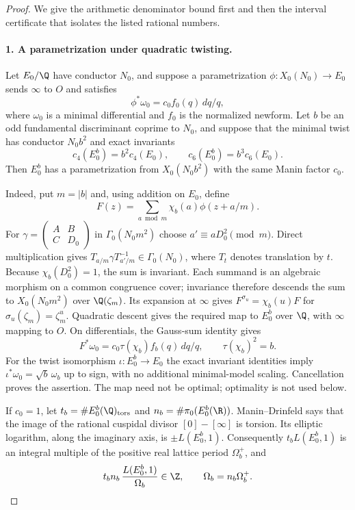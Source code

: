 \begin{proof}
We give the arithmetic denominator bound first and then the interval
certificate that isolates the listed rational numbers.

\paragraph{1. A parametrization under quadratic twisting.}
Let $E_0/\Q$ have conductor $N_0$, and suppose a parametrization
$\phi:X_0(N_0)\to E_0$ sends $\infty$ to $O$ and satisfies
\[
 \phi^*\omega_0=c_0f_0(q)\,dq/q,
\]
where $\omega_0$ is a minimal differential and $f_0$ is the normalized
newform. Let $b$ be an odd fundamental discriminant coprime to $N_0$,
and suppose that the minimal twist has conductor $N_0b^2$ and exact
invariants
\[
 c_4(E_0^b)=b^2c_4(E_0),\qquad
 c_6(E_0^b)=b^3c_6(E_0).
\]
Then $E_0^b$ has a parametrization from $X_0(N_0b^2)$ with the same
Manin factor $c_0$.

Indeed, put $m=|b|$ and, using addition on $E_0$, define
\[
 F(z)=\sum_{a\bmod m}\chi_b(a)\phi(z+a/m).
\]
For $\gamma=\left(\begin{smallmatrix}A&B\\C&D_0\end{smallmatrix}\right)$
in $\Gamma_0(N_0m^2)$ choose $a'\equiv aD_0^2\pmod m$.
Direct multiplication gives
$T_{a/m}\gamma T_{a'/m}^{-1}\in\Gamma_0(N_0)$, where $T_t$
denotes translation by $t$. Because $\chi_b(D_0^2)=1$, the sum is
invariant. Each summand is an algebraic morphism on a common
congruence cover; invariance therefore descends the sum to
$X_0(N_0m^2)$ over $\Q(\zeta_m)$. Its expansion at $\infty$
gives $F^{\sigma_u}=\chi_b(u)F$ for
$\sigma_u(\zeta_m)=\zeta_m^u$. Quadratic descent gives the required
map to $E_0^b$ over $\Q$, with $\infty$ mapping to $O$.
On differentials, the Gauss-sum identity gives
\[
 F^*\omega_0=c_0\tau(\chi_b)f_b(q)\,dq/q,
 \qquad \tau(\chi_b)^2=b.
\]
For the twist isomorphism $\iota:E_0^b\to E_0$ the exact invariant
identities imply
$\iota^*\omega_0=\sqrt b\,\omega_b$ up to sign, with no additional
minimal-model scaling. Cancellation proves the assertion. The map
need not be optimal; optimality is not used below.

If $c_0=1$, let $t_b=\#E_0^b(\Q)_{\rm tors}$ and
$n_b=\#\pi_0(E_0^b(\R))$. Manin--Drinfeld says that the image of
the rational cuspidal divisor $[0]-[\infty]$ is torsion. Its elliptic
logarithm, along the imaginary axis, is $\pm L(E_0^b,1)$.
Consequently $t_bL(E_0^b,1)$ is an integral multiple of the positive
real lattice period $\Omega_b^+$, and
\begin{equation}\label{ari:eq:Cgz-central-integrality}
 t_bn_b\,\frac{L(E_0^b,1)}{\Omega_b}\in\Z,
 \qquad \Omega_b=n_b\Omega_b^+.
\end{equation}


\end{proof}
